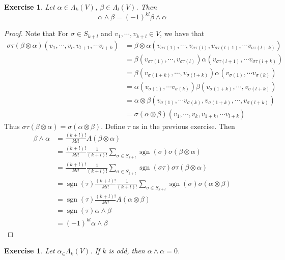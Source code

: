 \documentclass[12pt]{amsart}
\newtheorem{ex}[thm]{Exercise}
\newcommand{\al}{\alpha}
\newcommand{\bet}{\beta}
\newcommand{\Lam}{\Lambda}
\newcommand{\sig}{\sigma}
\DeclareMathOperator{\sgn}{sgn}
\begin{document}
	
	\begin{ex}
		Let $\al \in \Lam_k(V)$, $\beta \in \Lam_l(V)$. Then $$\al \wedge \bet = (-1)^{kl}\bet \wedge \al$$
	\end{ex}

	\begin{proof}
		Note that For $\sig \in S_{k+l}$ and $v_1, \cdots, v_{k +l} \in V$, we have that 
		\begin{align*}
			\sig \tau (\bet \otimes \al)(v_1, \cdots, v_l, v_{l+1}, \cdots v_{l+k}) 
			&= \bet \otimes \al(v_{\sig \tau(1)}, \cdots, v_{\sig \tau(l)}, v_{\sig \tau(l+1)}, \cdots v_{\sig \tau(l+k)}) \\
			&= \bet(v_{\sig \tau(1)}, \cdots, v_{\sig \tau(l)}) \al(v_{\sig \tau(l+1)}, \cdots v_{\sig \tau(l+k)}) \\
			&= \bet(v_{\sig (1+k)}, \cdots, v_{\sig (l+k)}) \al(v_{\sig (1)}, \cdots v_{\sig (k)})\\ 
			&= \al(v_{\sig (1)}, \cdots v_{\sig (k)}) \bet(v_{\sig (1+k)}, \cdots, v_{\sig (l+k)}) \\
			&= \al \otimes \bet (v_{\sig (1)}, \cdots v_{\sig (k)}, v_{\sig (1+k)}, \cdots, v_{\sig (l+k)}) \\
			&= \sig (\al \otimes \bet) (v_1, \cdots, v_k, v_{1+k}, \cdots v_{l+k})
		\end{align*}
		Thus $\sig \tau (\bet \otimes \al) = \sig (\al \otimes \bet)$.
		Define $\tau$ as in the previous exercise. Then 
		\begin{align*}
			\bet \wedge \al
			&= \frac{(k+l)!}{k!l!}A(\bet \otimes \al) \\
			&=  \frac{(k+l)!}{k!l!} \frac{1}{(k+l)!} \sum_{\sig \in S_{k+l}} \sgn(\sig) \sig (\bet \otimes \al) \\
			&= \frac{(k+l)!}{k!l!} \frac{1}{(k+l)!} \sum_{\sig \in S_{k+l}} \sgn(\sig \tau) \sig \tau (\bet \otimes \al) \\
			&= \sgn(\tau)\frac{(k+l)!}{k!l!} \frac{1}{(k+l)!} \sum_{\sig \in S_{k+l}} \sgn(\sig) \sig (\al \otimes \bet) \\
			&= \sgn(\tau)\frac{(k+l)!}{k!l!}  A(\al \otimes \bet) \\
			&= \sgn(\tau) \al \wedge \bet \\
			&= (-1)^{kl} \al \wedge \beta
		\end{align*}
	 
	\end{proof}

	\begin{ex}
		Let $\al_\in \Lam_k(V)$. If $k$ is odd, then $\al \wedge \al = 0$. 
	\end{ex}
\end{document}
